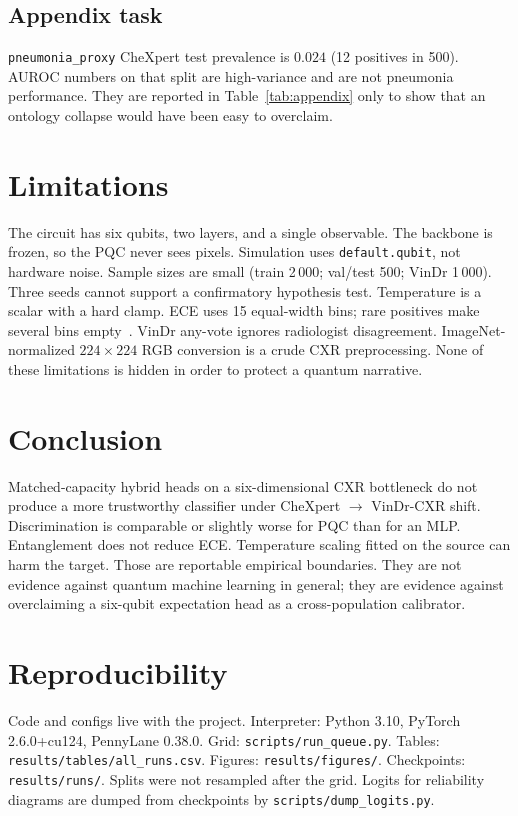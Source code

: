 \documentclass[11pt,a4paper]{article}
\begin{document}
\subsection{Appendix task}

\texttt{pneumonia\_proxy} CheXpert test prevalence is $0.024$ (12 positives in 500). AUROC numbers on that split are high-variance and are not pneumonia performance. They are reported in Table~\ref{tab:appendix} only to show that an ontology collapse would have been easy to overclaim.

\section{Limitations}

The circuit has six qubits, two layers, and a single observable. The backbone is frozen, so the PQC never sees pixels. Simulation uses \texttt{default.qubit}, not hardware noise. Sample sizes are small (train 2\,000; val/test 500; VinDr 1\,000). Three seeds cannot support a confirmatory hypothesis test. Temperature is a scalar with a hard clamp. ECE uses 15 equal-width bins; rare positives make several bins empty~\citep{nixon2019measuring}. VinDr any-vote ignores radiologist disagreement. ImageNet-normalized $224\times 224$ RGB conversion is a crude CXR preprocessing. None of these limitations is hidden in order to protect a quantum narrative.

\section{Conclusion}

Matched-capacity hybrid heads on a six-dimensional CXR bottleneck do not produce a more trustworthy classifier under CheXpert $\to$ VinDr-CXR shift. Discrimination is comparable or slightly worse for PQC than for an MLP. Entanglement does not reduce ECE. Temperature scaling fitted on the source can harm the target. Those are reportable empirical boundaries. They are not evidence against quantum machine learning in general; they are evidence against overclaiming a six-qubit expectation head as a cross-population calibrator.

\section*{Reproducibility}

Code and configs live with the project. Interpreter: Python 3.10, PyTorch 2.6.0+cu124, PennyLane 0.38.0. Grid: \texttt{scripts/run\_queue.py}. Tables: \texttt{results/tables/all\_runs.csv}. Figures: \texttt{results/figures/}. Checkpoints: \texttt{results/runs/}. Splits were not resampled after the grid. Logits for reliability diagrams are dumped from checkpoints by \texttt{scripts/dump\_logits.py}.
\end{document}
